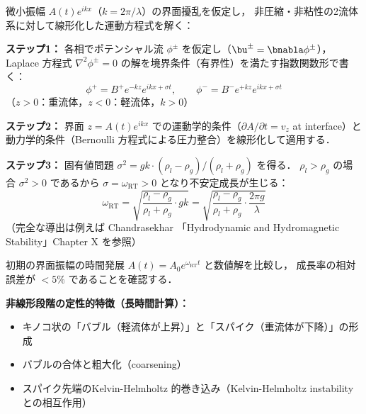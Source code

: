 \begin{tcolorbox}[defbox, title={線形成長率 $\omega_{\text{RT}}$ の導出（線形安定解析の概略）}]
微小振幅 $A(t) e^{ikx}$（$k = 2\pi/\lambda$）の界面擾乱を仮定し，
非圧縮・非粘性の2流体系に対して線形化した運動方程式を解く：

\textbf{ステップ1：} 各相でポテンシャル流 $\phi^\pm$ を仮定し（$\bu^\pm = \bnabla\phi^\pm$），
Laplace 方程式 $\nabla^2\phi^\pm = 0$ の解を境界条件（有界性）を満たす指数関数形で書く：
\[
  \phi^+ = B^+ e^{-kz} e^{ikx+\sigma t}, \qquad
  \phi^- = B^- e^{+kz} e^{ikx+\sigma t}
\]
（$z > 0$：重流体，$z < 0$：軽流体，$k > 0$）

\textbf{ステップ2：} 界面 $z = A(t) e^{ikx}$ での運動学的条件（$\partial A/\partial t = v_z$ at interface）と
動力学的条件（Bernoulli 方程式による圧力整合）を線形化して適用する．

\textbf{ステップ3：} 固有値問題 $\sigma^2 = gk \cdot (\rho_l - \rho_g)/(\rho_l + \rho_g)$ を得る．
$\rho_l > \rho_g$ の場合 $\sigma^2 > 0$ であるから $\sigma = \omega_{\text{RT}} > 0$ となり不安定成長が生じる：
\[
  \omega_{\text{RT}} = \sqrt{\frac{\rho_l - \rho_g}{\rho_l + \rho_g} \cdot gk}
  = \sqrt{\frac{\rho_l - \rho_g}{\rho_l + \rho_g} \cdot \frac{2\pi g}{\lambda}}
\]
（完全な導出は例えば Chandrasekhar \cite{Chandrasekhar1961}「Hydrodynamic and Hydromagnetic Stability」Chapter X を参照）
\end{tcolorbox}

初期の界面振幅の時間発展 $A(t) = A_0 e^{\omega_{\text{RT}} t}$ と数値解を比較し，
成長率の相対誤差が $< 5\%$ であることを確認する．

\textbf{非線形段階の定性的特徴（長時間計算）：}
\begin{itemize}
  \item キノコ状の「バブル（軽流体が上昇）」と「スパイク（重流体が下降）」の形成
  \item バブルの合体と粗大化（coarsening）
  \item スパイク先端のKelvin-Helmholtz 的巻き込み（Kelvin-Helmholtz instability との相互作用）
\end{itemize}

